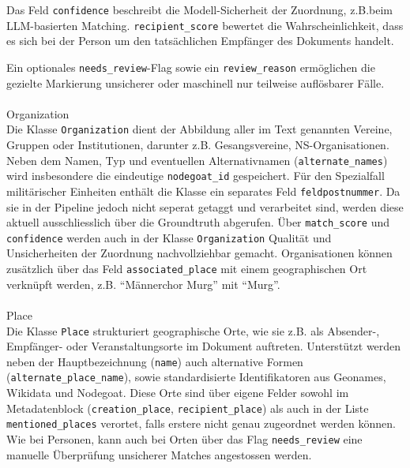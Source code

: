 \documentclass[12pt, a4paper, ngerman, bidi=default]{article}
\makeatletter
\newcommand{\code}[1]{\colorbox{VeryLightGray}{\texttt{#1}}} %
\let\oldparagraph\paragraph%
\renewcommand{\paragraph}{
    \@ifstar%
      \xxxParagraphStar%
      \xxxParagraphNoStar%
 }
\newcommand{\xxxParagraphStar}[1]{\oldparagraph*{#1}\mbox{}}
\newcommand{\xxxParagraphNoStar}[1]{\oldparagraph{#1}\mbox{}}
\makeatother
\begin{document}
Das Feld \code{confidence} beschreibt die Modell-Sicherheit der Zuordnung, z.B.beim LLM-basierten Matching. 
\code{recipient\_score} bewertet die Wahrscheinlichkeit, dass es sich bei der Person um den tatsächlichen Empfänger des Dokuments handelt. 

Ein optionales \code{needs\_review}-Flag sowie ein \code{review\_reason} ermöglichen die gezielte Markierung unsicherer oder 
maschinell nur teilweise auflösbarer Fälle.

\paragraph{Organization}\\
Die Klasse \code{Organization} dient der Abbildung aller im Text genannten Vereine, Gruppen oder Institutionen, 
darunter z.B. Gesangsvereine, NS-Organisationen. Neben dem Namen, Typ und eventuellen 
Alternativnamen (\code{alternate\_names}) wird insbesondere die eindeutige \code{nodegoat\_id} gespeichert. Für den Spezialfall 
militärischer Einheiten enthält die Klasse ein separates Feld \code{feldpostnummer}. Da sie in der Pipeline jedoch nicht seperat getaggt und verarbeitet sind,
werden diese aktuell ausschliesslich über die Groundtruth abgerufen. Über \code{match\_score} und \code{confidence} 
werden auch in der Klasse \code{Organization} Qualität und Unsicherheiten der Zuordnung nachvollziehbar gemacht. 
Organisationen können zusätzlich über das Feld \code{associated\_place} mit einem geographischen Ort verknüpft werden, z.B. \enquote{Männerchor Murg} mit \enquote{Murg}.

\paragraph{Place}\\
Die Klasse \code{Place} strukturiert geographische Orte, wie sie z.B. als Absender-, Empfänger- oder 
Veranstaltungsorte im Dokument auftreten. Unterstützt werden neben der Hauptbezeichnung (\code{name}) 
auch alternative Formen (\code{alternate\_place\_name}), sowie standardisierte Identifikatoren aus Geonames, 
Wikidata und Nodegoat. Diese Orte sind über eigene Felder sowohl im Metadatenblock (\code{creation\_place}, 
\code{recipient\_place}) als auch in der Liste \code{mentioned\_places} verortet, falls erstere nicht genau zugeordnet werden können. 
Wie bei Personen, kann auch bei Orten 
über das Flag \code{needs\_review} eine manuelle Überprüfung unsicherer Matches angestossen werden.
\end{document}
